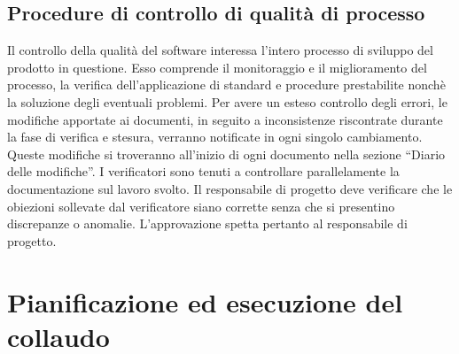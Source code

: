 \documentclass[11pt,titlepage,a4paper]{report}
\begin{document}
\section{Procedure di controllo di qualit\`a di processo}
Il controllo della qualit\`a del software interessa l'intero processo di sviluppo del prodotto in questione. Esso comprende il monitoraggio e il miglioramento del processo, la verifica dell'applicazione di standard e procedure prestabilite nonch\`e la soluzione degli eventuali problemi.
Per avere un esteso controllo degli errori, le modifiche apportate ai documenti, in seguito a inconsistenze riscontrate durante la fase di verifica e stesura, verranno notificate in ogni singolo cambiamento. Queste modifiche si troveranno all'inizio di ogni documento nella sezione ``Diario delle modifiche''. I verificatori sono tenuti a controllare parallelamente la documentazione sul lavoro svolto. Il responsabile di progetto deve verificare che le obiezioni sollevate dal verificatore siano corrette senza che si presentino discrepanze o anomalie. L'approvazione spetta pertanto al responsabile di progetto.

\chapter{Pianificazione ed esecuzione del collaudo}
\end{document}

